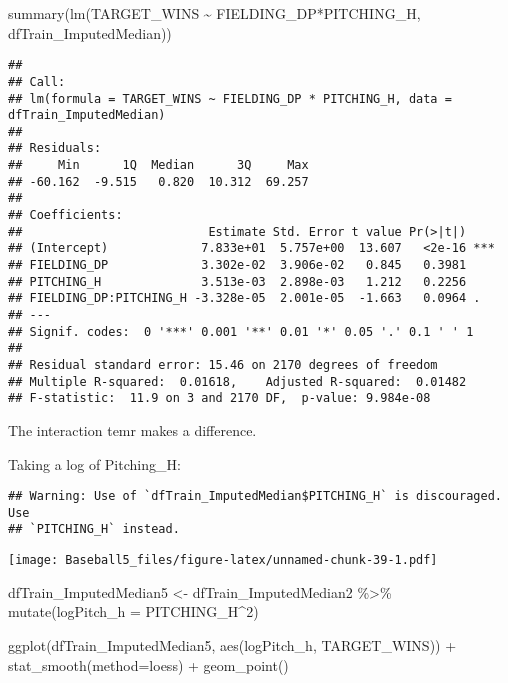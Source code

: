 \documentclass[
]{article}
\newenvironment{Shaded}{\begin{snugshade}}{\end{snugshade}}
\newcommand{\AttributeTok}[1]{\textcolor[rgb]{0.77,0.63,0.00}{#1}}
\newcommand{\DecValTok}[1]{\textcolor[rgb]{0.00,0.00,0.81}{#1}}
\newcommand{\FunctionTok}[1]{\textcolor[rgb]{0.00,0.00,0.00}{#1}}
\newcommand{\NormalTok}[1]{#1}
\newcommand{\OtherTok}[1]{\textcolor[rgb]{0.56,0.35,0.01}{#1}}
\newcommand{\SpecialCharTok}[1]{\textcolor[rgb]{0.00,0.00,0.00}{#1}}
\begin{document}
\begin{Shaded}
\begin{Highlighting}[]
\FunctionTok{summary}\NormalTok{(}\FunctionTok{lm}\NormalTok{(TARGET\_WINS }\SpecialCharTok{\textasciitilde{}}\NormalTok{ FIELDING\_DP}\SpecialCharTok{*}\NormalTok{PITCHING\_H, dfTrain\_ImputedMedian))}
\end{Highlighting}
\end{Shaded}

\begin{verbatim}
## 
## Call:
## lm(formula = TARGET_WINS ~ FIELDING_DP * PITCHING_H, data = dfTrain_ImputedMedian)
## 
## Residuals:
##     Min      1Q  Median      3Q     Max 
## -60.162  -9.515   0.820  10.312  69.257 
## 
## Coefficients:
##                          Estimate Std. Error t value Pr(>|t|)    
## (Intercept)             7.833e+01  5.757e+00  13.607   <2e-16 ***
## FIELDING_DP             3.302e-02  3.906e-02   0.845   0.3981    
## PITCHING_H              3.513e-03  2.898e-03   1.212   0.2256    
## FIELDING_DP:PITCHING_H -3.328e-05  2.001e-05  -1.663   0.0964 .  
## ---
## Signif. codes:  0 '***' 0.001 '**' 0.01 '*' 0.05 '.' 0.1 ' ' 1
## 
## Residual standard error: 15.46 on 2170 degrees of freedom
## Multiple R-squared:  0.01618,    Adjusted R-squared:  0.01482 
## F-statistic:  11.9 on 3 and 2170 DF,  p-value: 9.984e-08
\end{verbatim}

The interaction temr makes a difference.

Taking a log of Pitching\_H:

\begin{Shaded}
\end{Shaded}

\begin{verbatim}
## Warning: Use of `dfTrain_ImputedMedian$PITCHING_H` is discouraged. Use
## `PITCHING_H` instead.
\end{verbatim}

\texttt{[image: Baseball5\_files/figure-latex/unnamed-chunk-39-1.pdf]}

\begin{Shaded}
\begin{Highlighting}[]
\NormalTok{dfTrain\_ImputedMedian5 }\OtherTok{\textless{}{-}}\NormalTok{ dfTrain\_ImputedMedian2 }\SpecialCharTok{\%\textgreater{}\%}
  \FunctionTok{mutate}\NormalTok{(}\AttributeTok{logPitch\_h =}\NormalTok{ PITCHING\_H}\SpecialCharTok{\^{}}\DecValTok{2}\NormalTok{)}

\FunctionTok{ggplot}\NormalTok{(dfTrain\_ImputedMedian5, }\FunctionTok{aes}\NormalTok{(logPitch\_h, TARGET\_WINS)) }\SpecialCharTok{+}
          \FunctionTok{stat\_smooth}\NormalTok{(}\AttributeTok{method=}\NormalTok{loess) }\SpecialCharTok{+}
          \FunctionTok{geom\_point}\NormalTok{()}
\end{Highlighting}
\end{Shaded}
\end{document}
